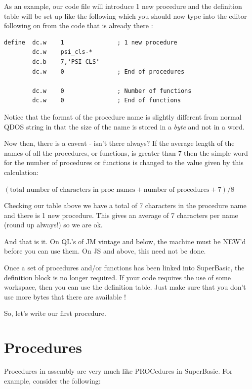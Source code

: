 As an example, our code file will introduce 1 new procedure and the
    definition table will be set up like the following which you should now
    type into the editor following on from the code that is already there
   :

\begin{lstlisting}[firstnumber=1,caption={Example Extension Parameter Table},label={lst:ExampleParameterTable}]
define  dc.w    1               ; 1 new procedure
        dc.w    psi_cls-*
        dc.b    7,'PSI_CLS'
        dc.w    0               ; End of procedures

        dc.w    0               ; Number of functions
        dc.w    0               ; End of functions
\end{lstlisting}

Notice that the format of the procedure name is slightly different
    from normal QDOS string in that the size of the name is stored in a \emph{byte}
    and not in a word.

Now then, there is a caveat -{} isn't there always? If the average
    length of the names of all the procedures, or functions, is greater than 7
    then the simple word for the number of procedures or functions is changed
    to the value given by this calculation:

$(\text{total number of characters in proc names} + \text{number of procedures} + 7) / 8$

Checking our table above we have a total of 7 characters in the
    procedure name and there is 1 new procedure. This gives an average of 7
    characters per name (round up always!) so we are ok.

And that is it. On QL's of JM vintage and below, the machine must be
    NEW'd before you can use them. On JS and above, this need not be
    done.

Once a set of procedures and/or functions has been linked into
    SuperBasic, the definition block is no longer required. If your code
    requires the use of some workspace, then you can use the definition table.
    Just make sure that you don't use more bytes that there are available
   !

So, let's write our first procedure.

\section{Procedures}
\label{ch7-procedures}%

Procedures in assembly are very much like PROCedures in SuperBasic.
    For example, consider the following:

